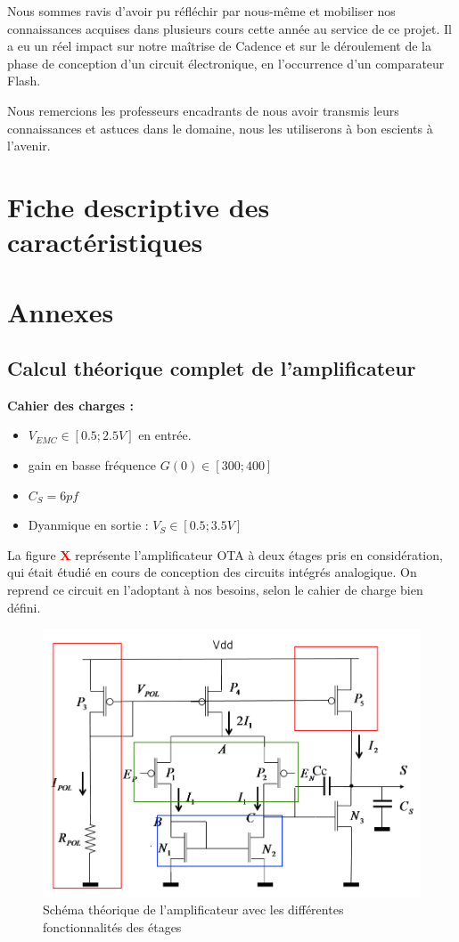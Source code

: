 \documentclass[11pt]{article}
\begin{document}
Nous sommes ravis d'avoir pu r\'efl\'echir par nous-m\^eme et mobiliser nos connaissances acquises dans plusieurs cours cette ann\'ee au service
de ce projet. Il a eu un r\'eel impact sur notre maîtrise de Cadence et sur le d\'eroulement de la phase de conception d'un circuit \'electronique,
en l'occurrence d'un comparateur Flash.

Nous remercions les professeurs encadrants de nous avoir transmis leurs connaissances et astuces dans le domaine, nous les utiliserons
\`a bon escients \`a l'avenir.

\clearpage

\section{Fiche descriptive des caract\'eristiques}

\clearpage

\section{Annexes}
\subsection{Calcul th\'eorique complet de l'amplificateur}\label{Annexe1}

\textbf{Cahier des charges :} 
\begin{itemize}\itemsep -4pt
\item $V_{EMC} \in [0.5; 2.5V]$ en entr\'ee.
\item gain en basse fr\'equence $G(0) \in [300;400]$
\item $C_{S} = 6 pf$
\item Dyanmique en sortie : $V_{S} \in [0.5; 3.5V]$ 
\end{itemize}

La figure \textbf{\textcolor{red}{X}} repr\'esente l'amplificateur OTA \`a deux \'etages pris
en consid\'eration, qui \'etait \'etudi\'e en cours de conception des circuits int\'egr\'es analogique\cite{TD4-AOP}.
On reprend ce circuit en l'adoptant \`a nos besoins, selon le cahier de charge bien d\'efini.

\begin{figure}[!htb]
      \centering
      \includegraphics[width=0.6\linewidth]{schema_composition_AOP_2_etages.png}
      \caption{Sch\'ema th\'eorique de l'amplificateur avec les diff\'erentes fonctionnalit\'es des \'etages}
\end{figure}%
\end{document}

